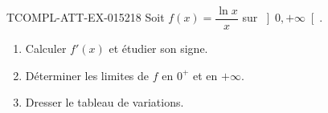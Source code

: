 \begin{exercice}{TCOMPL-ATT-EX-015}{2}{18}
Soit $f(x) = \dfrac{\ln x}{x}$ sur $\left]0, +\infty\right[$.
\begin{enumerate}
  \item Calculer $f'(x)$ et étudier son signe.
  \item Déterminer les limites de $f$ en $0^+$ et en $+\infty$.
  \item Dresser le tableau de variations.
\end{enumerate}

\end{exercice}
